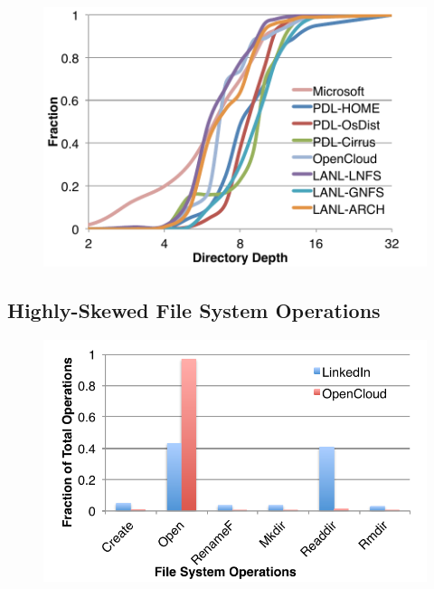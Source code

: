 \begin{figure}[!ht]
\center
\includegraphics[scale=0.4]{figs/directory_depth}
\caption{}
\label{fig:directory_depth}
\end{figure}

\subsection{Highly-Skewed File System Operations}

\begin{figure}[!ht]
\center
\includegraphics[scale=0.5]{figs/operation_distribution}
\caption{}
\label{fig:operation}
\end{figure}


